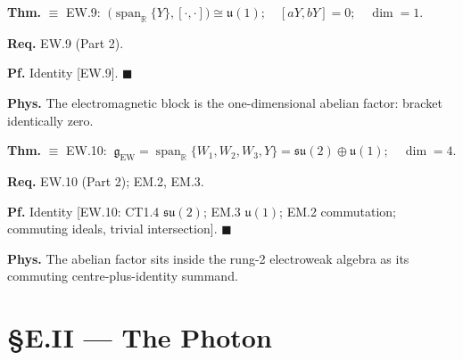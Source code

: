 \begin{theorem}\label{tag:EM-3}
\textbf{Thm.} $\equiv$ EW.9: $\ \bigl(\operatorname{span}_{\mathbb R}\{Y\},[\cdot,\cdot]\bigr)\cong\mathfrak u(1);\quad[aY,bY]=0;\quad\dim=1.$

\textbf{Req.} EW.9 (Part 2).

\textbf{Pf.} Identity [EW.9]. $\blacksquare$

\textbf{Phys.} The electromagnetic block is the one-dimensional abelian factor: bracket identically zero.

\end{theorem}

\begin{theorem}\label{tag:EM-4}
\textbf{Thm.} $\equiv$ EW.10: $\ \mathfrak g_{\mathrm{EW}}=\operatorname{span}_{\mathbb R}\{W_1,W_2,W_3,Y\}=\mathfrak{su}(2)\oplus\mathfrak u(1);\quad\dim=4.$

\textbf{Req.} EW.10 (Part 2); EM.2, EM.3.

\textbf{Pf.} Identity [EW.10: CT1.4 $\mathfrak{su}(2)$; EM.3 $\mathfrak u(1)$; EM.2 commutation; commuting ideals, trivial intersection]. $\blacksquare$

\textbf{Phys.} The abelian factor sits inside the rung-2 electroweak algebra as its commuting centre-plus-identity summand.

\end{theorem}

\section[§E.II — The Photon]{\texorpdfstring{§E.II — The Photon}{SE.II - The Photon}}

